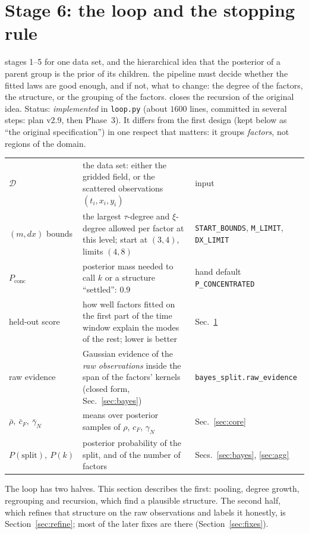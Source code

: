 \section{Stage 6: the loop and the stopping rule}\label{sec:loop}
\sectionbrief
{stages 1--5 for one data set, and the hierarchical idea that the posterior of a parent group is the prior of its children.}
{the pipeline must decide whether the fitted laws are good enough, and if not, what to change: the degree of the factors, the structure, or the grouping of the factors.}
{closes the recursion of the original idea. Status: \emph{implemented} in \texttt{loop.py} (about $1600$ lines, committed in several steps: plan v2.9, then Phase~3). It differs from the first design (kept below as ``the original specification'') in one respect that matters: it groups \emph{factors}, not regions of the domain.}

\begin{symbols}
\begin{tabular}{@{}L{2.6cm}L{6.0cm}L{4.3cm}@{}}
$\mathcal D$ & the data set: either the gridded field, or the scattered observations $(t_i,x_i,y_i)$ & input\\
$(m,dx)$ bounds & the largest $\tau$-degree and $\xi$-degree allowed per factor at this level; start at $(3,4)$, limits $(4,8)$ & \texttt{START\_BOUNDS}, \texttt{M\_LIMIT}, \texttt{DX\_LIMIT}\\
$P_{\mathrm{conc}}$ & posterior mass needed to call $k$ or a structure ``settled'': $0.9$ & hand default \texttt{P\_CONCENTRATED}\\
held-out score & how well factors fitted on the first part of the time window explain the modes of the rest; lower is better & Sec.~\ref{sec:loop}\\
raw evidence & Gaussian evidence of the \emph{raw observations} inside the span of the factors' kernels (closed form, Sec.~\ref{sec:bayes}) & \texttt{bayes\_split.raw\_evidence}\\
$\bar\rho,\ \bar c_F,\ \bar\gamma_N$ & means over posterior samples of $\rho$, $c_F$, $\gamma_N$ & Sec.~\ref{sec:core}\\
$P(\text{split}),\ P(k)$ & posterior probability of the split, and of the number of factors & Secs.~\ref{sec:bayes}, \ref{sec:agg}\\
\end{tabular}
\end{symbols}

The loop has two halves. This section describes the first: pooling, degree growth, regrouping and recursion, which find a plausible structure. The second half, which refines that structure on the raw observations and labels it honestly, is Section~\ref{sec:refine}; most of the later fixes are there (Section~\ref{sec:fixes}).

